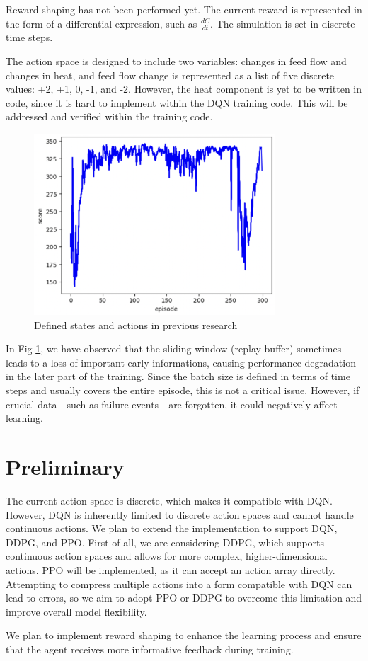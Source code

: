 \documentclass[11pt]{article}
\begin{document}
Reward shaping has not been performed yet. 
The current reward is represented in the form of a differential expression, such as $\frac{dC}{dt}$.
The simulation is set in discrete time steps.

The action space is designed to include two variables: changes in feed flow and changes in heat, 
and feed flow change is represented as a list of five discrete values: +2, +1, 0, -1, and -2. 
However, the heat component is yet to be written in code, since it is hard to implement within the DQN training code. 
This will be addressed and verified within the training code.

\begin{figure}[H]
    \centering
    \includegraphics[width=9cm]{Fig2_buffer.png} %
    \caption{Defined states and actions in previous research}
    \label{fig2}
\end{figure}

In Fig \ref{fig2}, we have observed that the sliding window (replay buffer) sometimes leads to a loss of important early informations, causing performance degradation in the later part of the training. 
Since the batch size is defined in terms of time steps and usually covers the entire episode, this is not a critical issue.
However, if crucial data—such as failure events—are forgotten, it could negatively affect learning.

\section{Preliminary}

The current action space is discrete, which makes it compatible with DQN.
However, DQN is inherently limited to discrete action spaces and cannot handle continuous actions.
We plan to extend the implementation to support DQN, DDPG, and PPO. 
First of all, we are considering DDPG, which supports continuous action spaces and allows for more complex, higher-dimensional actions.
PPO will be implemented, as it can accept an action array directly.
Attempting to compress multiple actions into a form compatible with DQN can lead to errors, so we aim to adopt PPO or DDPG to overcome this limitation and improve overall model flexibility.

We plan to implement reward shaping to enhance the learning process and ensure that the agent receives more informative feedback during training.


\end{document}

